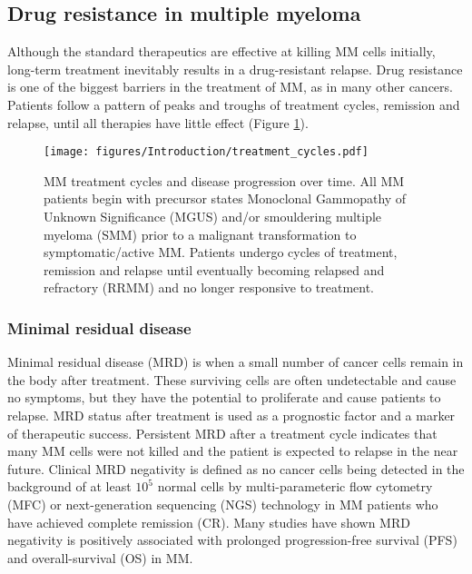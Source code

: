 \subsection{Drug resistance in multiple myeloma}
Although the standard therapeutics are effective at killing MM cells initially, long-term treatment inevitably results in a drug-resistant relapse.
Drug resistance is one of the biggest barriers in the treatment of MM, as in many other cancers.
Patients follow a pattern of peaks and troughs of treatment cycles, remission and relapse, until all therapies have little effect (Figure \ref{fig:treatment_cycles}).
\begin{figure}[htb]
\centering
\texttt{[image: figures/Introduction/treatment\_cycles.pdf]}
\caption[MM treatment cycles]{MM treatment cycles and disease progression over time.
All MM patients begin with precursor states Monoclonal Gammopathy of Unknown Significance (MGUS) and/or smouldering multiple myeloma (SMM) prior to a malignant transformation to symptomatic/active MM.
Patients undergo cycles of treatment, remission and relapse until eventually becoming relapsed and refractory (RRMM) and no longer responsive to treatment.
}
\label{fig:treatment_cycles}
\end{figure}
\subsubsection{Minimal residual disease}
Minimal residual disease (MRD) is when a small number of cancer cells remain in the body after treatment.
These surviving cells are often undetectable and cause no symptoms, but they have the potential to proliferate and cause patients to relapse.
MRD status after treatment is used as a prognostic factor and a marker of therapeutic success.
Persistent MRD after a treatment cycle indicates that many MM cells were not killed and the patient is expected to relapse in the near future\cite{ding2021minimal}.
Clinical MRD negativity is defined as no cancer cells being detected in the background of at least $10^5$ normal cells by multi-parameteric flow cytometry (MFC) or next-generation sequencing (NGS) technology in MM patients who have achieved complete remission (CR)\cite{kumar2016international}.
Many studies have shown MRD negativity is positively associated with prolonged progression-free survival (PFS) and overall-survival (OS) in MM\cite{paiva2008multiparameter, martinez2014prognostic, munshi2020large}.


